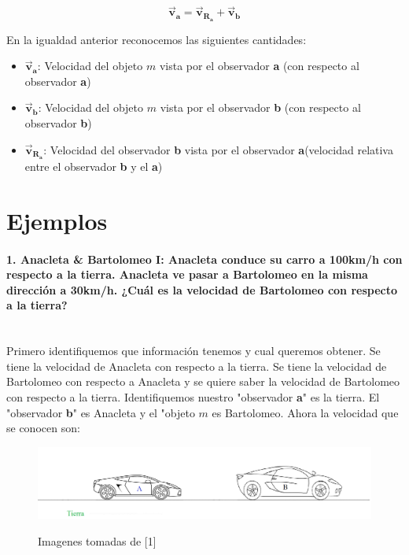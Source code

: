 \documentclass[a4paper,11pt]{article}
\theoremstyle{mytheor}
\begin{document}
\begin{equation}\label{2}
\vec{\textbf{v}}_{\textbf{a}} = \vec{\textbf{v}}_{\textbf{R}_\textbf{a}} + \vec{\textbf{v}}_{\textbf{b}}
\end{equation}

En la igualdad anterior reconocemos las siguientes cantidades:

\begin{itemize}
\item $\vec{\textbf{v}}_{\textbf{a}}$: Velocidad del objeto $m$ vista por el observador \textbf{a} (con respecto al observador \textbf{a})
\item $\vec{\textbf{v}}_{\textbf{b}}$: Velocidad del objeto $m$ vista por el observador \textbf{b} (con respecto al observador \textbf{b})
\item $\vec{\textbf{v}}_{\textbf{R}_\textbf{a}}$: Velocidad del observador \textbf{b} vista por el observador \textbf{a}(velocidad relativa entre el observador \textbf{b} y el \textbf{a})
\end{itemize}

\section{Ejemplos}

\paragraph{1. Anacleta \& Bartolomeo I: Anacleta conduce su carro a 100km/h con respecto a la tierra. Anacleta ve pasar a Bartolomeo en la misma dirección  a 30km/h. ¿Cuál es la velocidad de Bartolomeo con respecto a la tierra?\\
\\	}



Primero identifiquemos que información tenemos y cual queremos obtener. Se tiene la velocidad de Anacleta con respecto a la tierra. Se tiene la velocidad de Bartolomeo con respecto a Anacleta y se quiere saber la velocidad de Bartolomeo con respecto a la tierra. Identifiquemos nuestro "observador \textbf{a}" es la tierra. El "observador \textbf{b}" es Anacleta y el "objeto $m$ es Bartolomeo. Ahora la velocidad que se conocen son:


\begin{figure}[h]
	\includegraphics[width=.9\linewidth]{c2}
	\label{fcN4}
	\caption{Imagenes tomadas de [1]}
\end{figure}
\end{document}

